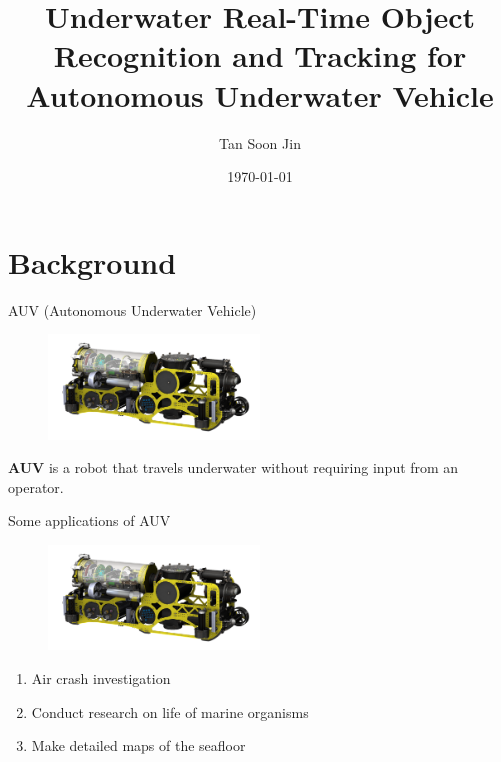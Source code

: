 \documentclass[13pt]{beamer}
\title{Underwater Real-Time Object Recognition and Tracking for Autonomous Underwater Vehicle}
\author{Tan Soon Jin}
\date{\today}
\institute{National University of Singapore}
\begin{document}
\maketitle


\section{Background}


\begin{frame}{AUV (Autonomous Underwater Vehicle)}

  \begin{figure}[ht]
      \centering
      \includegraphics[width=0.5\textwidth, height=0.3\textwidth]{figs/auv.png}
  \end{figure}

  \textbf{AUV} is a robot that travels underwater without requiring input from an operator.

\end{frame}

\begin{frame}{Some applications of AUV}

  \begin{figure}[ht]
      \centering
      \includegraphics[width=0.5\textwidth, height=0.3\textwidth]{figs/auv.png}
  \end{figure}

  \begin{enumerate}
    \item Air crash investigation
    \item Conduct research on life of marine organisms
    \item Make detailed maps of the seafloor
  \end{enumerate}

\end{frame}
\end{document}
